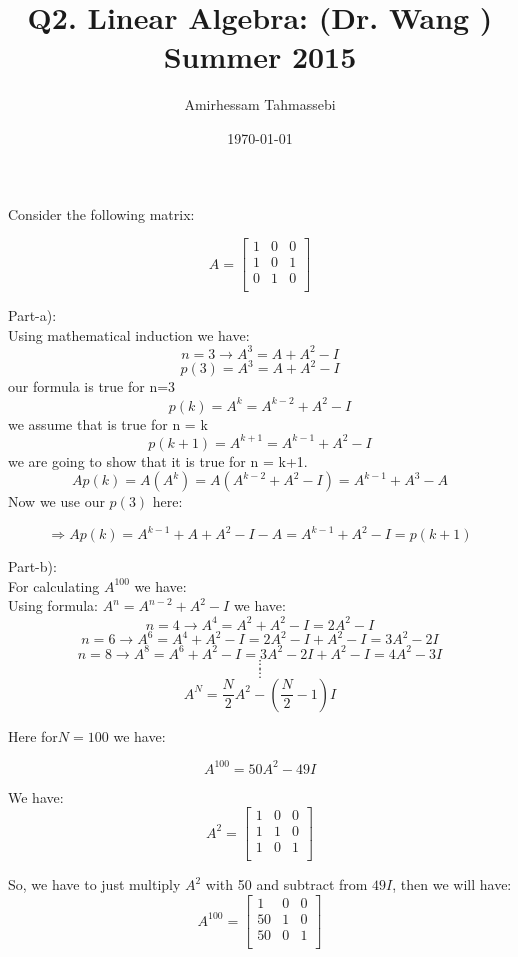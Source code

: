 \documentclass[a4paper]{article}
\title{Q2. Linear Algebra: (Dr. Wang )\\Summer 2015}
\author{Amirhessam Tahmassebi}
\date{\today}
\begin{document}
\maketitle

Consider the following matrix:

\[A=
\begin{bmatrix}
  1 & 0 & 0 \\
  1 & 0 & 1 \\
  0 & 1 & 0 \\
\end{bmatrix}
\]

Part-a): \\
Using mathematical induction we have: \\

$$n=3 \longrightarrow A^3 = A + A^2 -I$$
$$p(3) = A^3 = A + A^2 -I$$ our formula is true for n=3
$$p(k) = A^k = A^{k-2} + A^2 - I$$ we assume that is true for n = k
$$p(k+1) = A^{k+1} = A^{k-1} +A^2 -I$$ we are going to show that it is true for n = k+1. \\

$$Ap(k) = A(A^k) = A(A^{k-2} + A^2 -I) = A^{k-1} + A^3 - A$$ Now we use our $p(3)$ here:

$$\Longrightarrow Ap(k) = A^{k-1} + A + A^2 - I - A =A^{k-1} + A^2 - I =p(k+1)$$




Part-b): \\

For calculating $A^{100}$ we have:\\

Using formula: $ A^n = A^{n-2} + A^2 -I$ we have: \\
$$n=4 \longrightarrow A^4 = A^2+A^2 - I = 2A^2-I$$
$$n=6 \longrightarrow A^6 = A^4+A^2 - I = 2A^2-I + A^2 - I = 3A^2 - 2I$$
$$n=8 \longrightarrow A^8 = A^6+A^2 - I =3A^2 - 2I + A^2 -I = 4A^2 -3I$$
$$\vdots$$
$$\vdots$$
$$A^{N} = \frac{N}{2}A^2 - (\frac{N}{2} -1)I$$

Here for$ N = 100$ we have:

$$A^{100} = 50A^2 - 49I$$

We have:\\


\[A^2=
\begin{bmatrix}
  1 & 0 & 0 \\
  1 & 1 & 0 \\
  1 & 0 & 1 \\
\end{bmatrix}
\]


So, we have to just multiply $A^2$ with 50 and subtract from $49I$, then we will have: \\


\[A^{100}=
\begin{bmatrix}
  1 & 0 & 0 \\
  50 & 1 & 0 \\
  50 & 0 & 1 \\
\end{bmatrix}
\]
\end{document}
